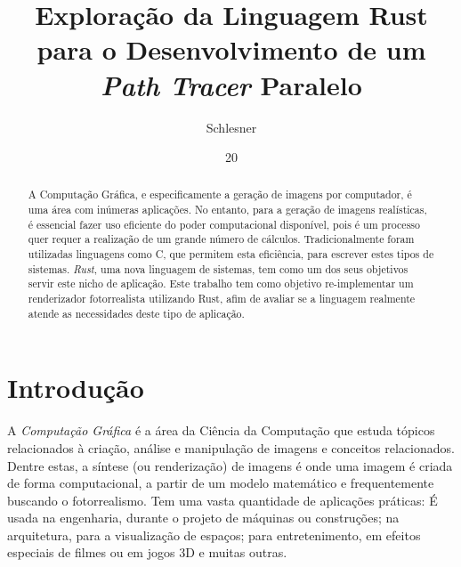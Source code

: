 \documentclass[tg]{mdtufsm}
\title{Exploração da Linguagem Rust para o Desenvolvimento de um \emph{Path Tracer} Paralelo}
\author{Schlesner}{Yuri Kunde}
\institute{Centro de Tecnologia}
\date{20}{Outubro}{2014}
\def\Cpp{{C\nolinebreak[4]\raisebox{.20ex}{\small\bf++}}}
\begin{document}
\maketitle
\makeapprove

\begin{abstract}
A Computação Gráfica, e especificamente a geração de imagens por computador, é uma área com
inúmeras aplicações. No entanto, para a geração de imagens realísticas, é essencial fazer
uso eficiente do poder computacional disponível, pois é um processo quer requer a realização
de um grande número de cálculos. Tradicionalmente foram utilizadas linguagens como \Cpp, que
permitem esta eficiência, para escrever estes tipos de sistemas. \emph{Rust}, uma nova
linguagem de sistemas, tem como um dos seus objetivos servir este nicho de aplicação. Este
trabalho tem como objetivo re-implementar um renderizador fotorrealista utilizando Rust,
afim de avaliar se a linguagem realmente atende as necessidades deste tipo de aplicação.
\end{abstract}

\tableofcontents

\setlength{\baselineskip}{1.5\baselineskip}


\chapter{Introdução}

A \emph{Computação Gráfica} é a área da Ciência da Computação que estuda tópicos relacionados à
criação, análise e manipulação de imagens e conceitos relacionados. Dentre estas, a síntese (ou
renderização) de imagens é onde uma imagem é criada de forma computacional, a partir de um modelo
matemático e frequentemente buscando o fotorrealismo. Tem uma vasta quantidade de aplicações
práticas: É usada na engenharia, durante o projeto de máquinas ou construções; na arquitetura, para
a visualização de espaços; para entretenimento, em efeitos especiais de filmes ou em jogos 3D e
muitas outras.
\end{document}
